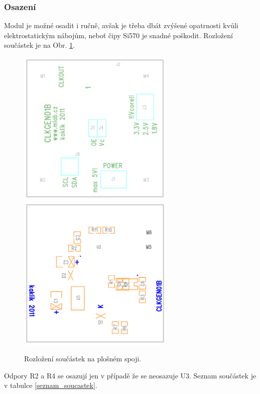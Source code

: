 \documentclass[12pt,a4paper,oneside]{article}
\begin{document}
\subsubsection{Osazení}

Modul je možné osadit i ručně, avšak je třeba dbát zvýšené opatrnosti kvůli elektrostatickým nábojům, neboť čipy Si570 je snadné poškodit. Rozložení součástek je na Obr. \ref{Osazovaky}.


\newpage

\begin{figure}[htbp]
\begin{center}
\includegraphics [width=75mm] {./img/O1.png} 
\includegraphics [width=75mm] {./img/O2.png} 
\end{center}
\caption{Rozložení součástek na plošném spoji.}
\label{Osazovaky}
\end{figure}

Odpory R2 a R4 se osazují jen v případě že se neosazuje U3. Seznam součástek je v tabulce \ref{seznam_soucastek}.
\end{document}
